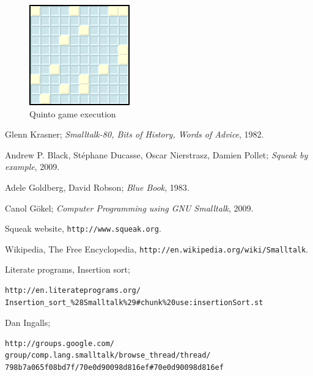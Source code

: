 \documentclass[5pt]{article}
\begin{document}
\begin{enumerate}
\begin{description}
 \begin{figure}[ht]
  \centering
  \includegraphics{img/Quinto-game}
  \caption{Quinto game execution}
  \label{fig:quinto_exec}
\end{figure}
 
  \end{description}
\end{enumerate}

\begin{thebibliography}{1}

Glenn Krasner; \textit{Smalltalk-80, Bits of History, Words of Advice}, 1982.

Andrew P. Black, Stéphane Ducasse,
Oscar Nierstrasz, Damien Pollet; \textit{Squeak by example}, 2009.

Adele Goldberg, David Robson; \textit{Blue Book},
1983.

Canol Gökel; \textit{Computer
Programming using GNU Smalltalk}, 2009.

Squeak website,
\verb|http://www.squeak.org|.

Wikipedia, The Free Encyclopedia,
\verb|http://en.wikipedia.org/wiki/Smalltalk|.

Literate
programs,
Insertion
sort;
\begin{verbatim}
http://en.literateprograms.org/
Insertion_sort_%28Smalltalk%29#chunk%20use:insertionSort.st
\end{verbatim}

Dan Ingalls; \begin{verbatim}http://groups.google.com/
group/comp.lang.smalltalk/browse_thread/thread/
798b7a065f08bd7f/70e0d90098d816ef#70e0d90098d816ef
\end{verbatim}

\end{thebibliography}
\end{document}
